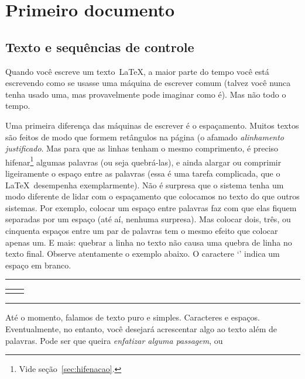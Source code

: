 \section{Primeiro documento}


\subsection{Texto e sequências de controle}\label{sec:seq-controle}

Quando você escreve um texto~\LaTeX, a maior parte do tempo você está
escrevendo como se usasse uma máquina de escrever comum (talvez você nunca tenha usado uma, mas provavelmente pode imaginar como é). Mas não todo o tempo. 

Uma primeira diferença das máquinas de escrever é o espaçamento. Muitos textos são feitos de modo que formem retângulos na página (o afamado \emph{alinhamento justificado}. Mas para que as linhas tenham o mesmo comprimento, é preciso hifenar\footnote{Vide seção~\ref{sec:hifenacao}.} algumas palavras (ou seja quebrá-las), e ainda alargar ou comprimir ligeiramente o espaço entre as palavras (essa é uma tarefa complicada, que o \LaTeX\ desempenha exemplarmente). Não é surpresa que o sistema tenha um modo diferente de lidar com o espaçamento que colocamos no texto do que outros sistemas. Por exemplo, colocar um espaço entre palavras faz com que elas fiquem separadas por um espaço (até aí, nenhuma surpresa). Mas colocar dois, três, ou cinquenta espaços entre um par de palavras tem o mesmo efeito que colocar apenas um. E mais: quebrar a linha no texto não causa uma quebra de linha no texto final. Observe atentamente o exemplo abaixo. O caractere `\texttt{\textvisiblespace}' indica um espaço em branco.

\medskip
\begin{center}\hrule\smallskip
\begin{tabular}{c|c}
\begin{minipage}{.405\textwidth}\footnotesize

\end{minipage} &
\begin{minipage}{.535\textwidth}\setlength{\parindent}{1pc}

\end{minipage}
\end{tabular}
\smallskip\hrule
\end{center}
\medskip

Até o momento, falamos de texto puro e simples. Caracteres e espaços. Eventualmente, no entanto, você desejará acrescentar algo ao
texto além de palavras. Pode ser que queira \emph{enfatizar alguma
  passagem}, ou

